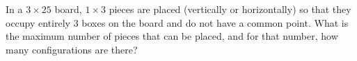 In a $3 \times 25$ board, $1 \times 3$ pieces are placed (vertically or horizontally) so that they occupy entirely $3$ boxes on the board and do not have a common point.
What is the maximum number of pieces that can be placed, and for that number, how many configurations are there?
